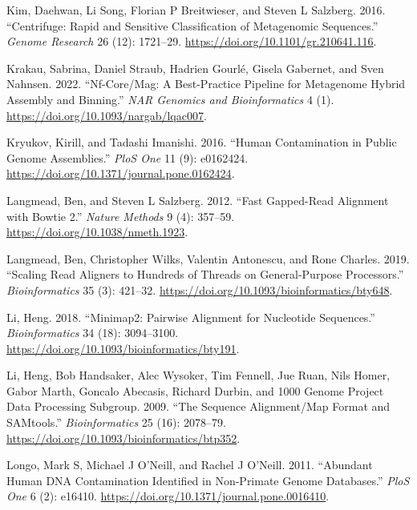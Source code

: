 \documentclass[
]{article}
\newlength{\cslhangindent}
\newlength{\cslentryspacingunit} %
\newenvironment{CSLReferences}[2] %
 {%
  \setlength{\parindent}{0pt}
  \ifodd #1
  \let\oldpar\par
  \def\par{\hangindent=\cslhangindent\oldpar}
  \fi
  \setlength{\parskip}{#2\cslentryspacingunit}
 }%
 {}
\begin{document}
\begin{CSLReferences}{1}{0}
\leavevmode{}%
Kim, Daehwan, Li Song, Florian P Breitwieser, and Steven L Salzberg.
2016. {``Centrifuge: Rapid and Sensitive Classification of Metagenomic
Sequences.''} \emph{Genome Research} 26 (12): 1721--29.
\url{https://doi.org/10.1101/gr.210641.116}.

\leavevmode{}%
Krakau, Sabrina, Daniel Straub, Hadrien Gourlé, Gisela Gabernet, and
Sven Nahnsen. 2022. {``Nf-Core/Mag: A Best-Practice Pipeline for
Metagenome Hybrid Assembly and Binning.''} \emph{NAR Genomics and
Bioinformatics} 4 (1). \url{https://doi.org/10.1093/nargab/lqac007}.

\leavevmode{}%
Kryukov, Kirill, and Tadashi Imanishi. 2016. {``Human Contamination in
Public Genome Assemblies.''} \emph{PloS One} 11 (9): e0162424.
\url{https://doi.org/10.1371/journal.pone.0162424}.

\leavevmode{}%
Langmead, Ben, and Steven L Salzberg. 2012. {``Fast Gapped-Read
Alignment with Bowtie 2.''} \emph{Nature Methods} 9 (4): 357--59.
\url{https://doi.org/10.1038/nmeth.1923}.

\leavevmode{}%
Langmead, Ben, Christopher Wilks, Valentin Antonescu, and Rone Charles.
2019. {``Scaling Read Aligners to Hundreds of Threads on General-Purpose
Processors.''} \emph{Bioinformatics} 35 (3): 421--32.
\url{https://doi.org/10.1093/bioinformatics/bty648}.

\leavevmode{}%
Li, Heng. 2018. {``{Minimap2}: Pairwise Alignment for Nucleotide
Sequences.''} \emph{Bioinformatics} 34 (18): 3094--3100.
\url{https://doi.org/10.1093/bioinformatics/bty191}.

\leavevmode{}%
Li, Heng, Bob Handsaker, Alec Wysoker, Tim Fennell, Jue Ruan, Nils
Homer, Gabor Marth, Goncalo Abecasis, Richard Durbin, and 1000 Genome
Project Data Processing Subgroup. 2009. {``The Sequence Alignment/Map
Format and {SAMtools}.''} \emph{Bioinformatics} 25 (16): 2078--79.
\url{https://doi.org/10.1093/bioinformatics/btp352}.

\leavevmode{}%
Longo, Mark S, Michael J O'Neill, and Rachel J O'Neill. 2011.
{``Abundant Human {DNA} Contamination Identified in Non-Primate Genome
Databases.''} \emph{PloS One} 6 (2): e16410.
\url{https://doi.org/10.1371/journal.pone.0016410}.


\end{CSLReferences}
\end{document}
